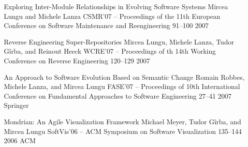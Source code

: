 \begin{enumerate}

\densepap
	{Exploring Inter-Module Relationships in Evolving Software Systems}
	{Mircea Lungu and Michele Lanza}
	{CSMR'07 -- Proceedings of the 11th European Conference on Software Maintenance and Reengineering }
	{91--100}
	{2007}
	{\IEEE}

\densepap
	{Reverse Engineering Super-Repositories}
	{Mircea Lungu, Michele Lanza, Tudor G\^irba, and Reinout Heeck}
	{WCRE'07 -- Proceedings of th 14th Working Conference on Reverse Engineering}
	{120--129}
	{2007}
	{\IEEE}

\densepap
	{An Approach to Software Evolution Based on Semantic Change}
	{Romain Robbes, Michele Lanza, and Mircea Lungu}
	{FASE'07 -- Proceedings of 10th International Conference on Fundamental Approaches to Software Engineering}
	{27--41}
	{2007}
	{Springer}


\densepap
	{Mondrian: An Agile Visualization Framework}
	{Michael Meyer, Tudor G\^irba, and Mircea Lungu}
	{SoftVis'06 -- ACM Symposium on Software Visualization}
	{135--144}
	{2006}
	{ACM}

\end{enumerate}